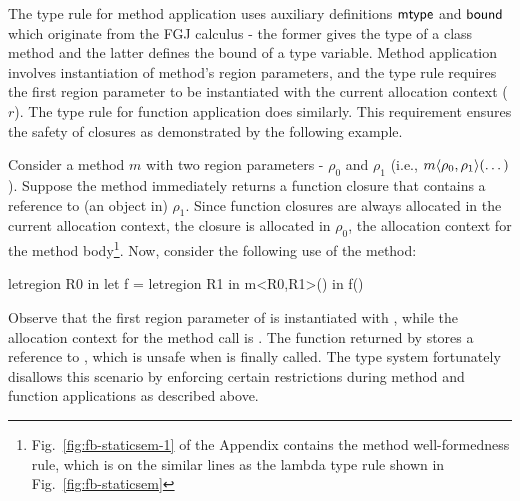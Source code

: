 The type rule for method application uses auxiliary definitions
${\sf mtype}$ and ${\sf bound}$ which originate from the FGJ calculus - the
former gives the type of a class method and the latter defines the
bound of a type variable. Method application involves instantiation of
method's region parameters, and the type rule requires the first
region parameter to be instantiated with the current allocation
context ($r$). The type rule for function application does similarly.
This requirement ensures the safety of closures as demonstrated by the
following example.

Consider a method $m$ with two region parameters - $\rho_0$ and
$\rho_1$ (i.e., $m\langle \rho_0,\rho_1 \rangle(\dots)$). Suppose the method
immediately returns a function closure that contains a reference to
(an object in) $\rho_1$. Since function closures are always allocated
in the current allocation context, the closure is allocated in
$\rho_0$, the allocation context for the method body\footnote{
Fig.~\ref{fig:fb-staticsem-1} of the Appendix contains the method
well-formedness rule, which is on the similar lines as the lambda type
rule shown in Fig.~\ref{fig:fb-staticsem}}. Now, consider the
following use of the method:
\begin{codejava}
letregion R0 in
  let f = letregion R1 in m<R0,R1>()
  in f()
\end{codejava}
Observe that the first region parameter of  is instantiated with
, while the allocation context for the method call is .
The function  returned by  stores a reference to ,
which is unsafe when  is finally called. The type system
fortunately disallows this scenario by enforcing certain restrictions
during method and function applications as described above.


